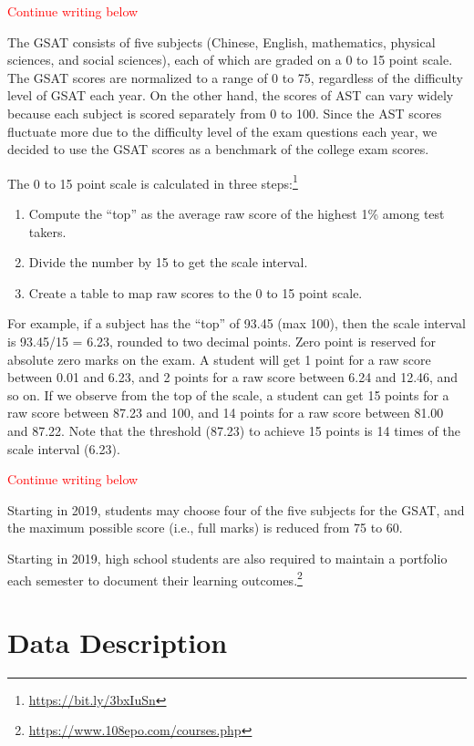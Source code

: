 \documentclass[
]{article}
\providecommand{\tightlist}{%
  \setlength{\itemsep}{0pt}\setlength{\parskip}{0pt}}
\begin{document}
\textcolor{red}{Continue writing below}

The GSAT consists of five subjects (Chinese, English, mathematics,
physical sciences, and social sciences), each of which are graded on a 0
to 15 point scale. The GSAT scores are normalized to a range of 0 to 75,
regardless of the difficulty level of GSAT each year. On the other hand,
the scores of AST can vary widely because each subject is scored
separately from 0 to 100. Since the AST scores fluctuate more due to the
difficulty level of the exam questions each year, we decided to use the
GSAT scores as a benchmark of the college exam scores.

The 0 to 15 point scale is calculated in three steps:\footnote{\url{https://bit.ly/3bxIuSn}}

\begin{enumerate}
\def\labelenumi{\arabic{enumi}.}
\tightlist
\item
  Compute the ``top'' as the average raw score of the highest 1\% among
  test takers.
\item
  Divide the number by 15 to get the scale interval.
\item
  Create a table to map raw scores to the 0 to 15 point scale.
\end{enumerate}

For example, if a subject has the ``top'' of 93.45 (max 100), then the
scale interval is 93.45/15 = 6.23, rounded to two decimal points. Zero
point is reserved for absolute zero marks on the exam. A student will
get 1 point for a raw score between 0.01 and 6.23, and 2 points for a
raw score between 6.24 and 12.46, and so on. If we observe from the top
of the scale, a student can get 15 points for a raw score between 87.23
and 100, and 14 points for a raw score between 81.00 and 87.22. Note
that the threshold (87.23) to achieve 15 points is 14 times of the scale
interval (6.23).

\textcolor{red}{Continue writing below}

Starting in 2019, students may choose four of the five subjects for the
GSAT, and the maximum possible score (i.e., full marks) is reduced from
75 to 60.

Starting in 2019, high school students are also required to maintain a
portfolio each semester to document their learning outcomes.\footnote{\url{https://www.108epo.com/courses.php}}

\hypertarget{data}{%
\section{Data Description}\label{data}}
\end{document}
